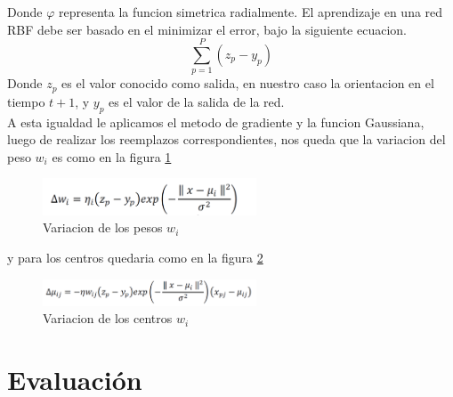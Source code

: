 \documentclass[conference]{IEEEtran}
\begin{document}
Donde $\varphi$ representa la funcion simetrica radialmente.
El aprendizaje en una red RBF debe ser basado en el minimizar el error, bajo la siguiente ecuacion.
\[
\sum_{p=1}^{P}(z_p-y_p)
\]
Donde $z_p$ es el valor conocido como salida, en nuestro caso la orientacion en el tiempo $t+1$, y $y_p$ es el valor de la salida de la red.\\
A esta igualdad le aplicamos el metodo de gradiente y la funcion Gaussiana,  luego de realizar los reemplazos correspondientes, nos queda que la variacion  del peso $w_i$ es como en la figura  \ref{fig_eq1} \\
\begin{figure}
\centering
\includegraphics[width=2.5in]{eq1.pdf}
\caption{Variacion de los pesos $w_i$ }
\label{fig_eq1}
\end{figure}
y para los centros quedaria como en la figura \ref{fig_eq2}\\
\begin{figure}
\centering
\includegraphics[width=2.5in]{eq2.pdf}
\caption{Variacion de los centros $w_i$ }
\label{fig_eq2}
\end{figure}

\section{Evaluaci\'on}
\end{document}
